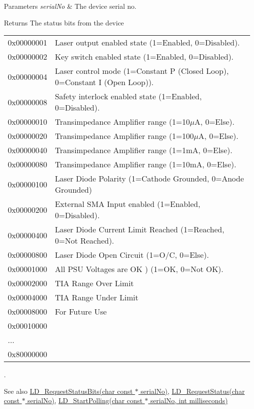 \begin{DoxyParams}{Parameters}
{\em serial\+No} & The device serial no. \\
\hline
\end{DoxyParams}
\begin{DoxyReturn}{Returns}
The status bits from the device \tabulinesep=1mm
\begin{longtabu} spread 0pt [c]{*2{|X[-1]}|}
\hline
0x00000001&Laser output enabled state (1=Enabled, 0=Disabled). \\
0x00000002&Key switch enabled state (1=Enabled, 0=Disabled). \\
0x00000004&Laser control mode (1=Constant P (Closed Loop), 0=Constant I (Open Loop)). \\
0x00000008&Safety interlock enabled state (1=Enabled, 0=Disabled). \\
0x00000010&Transimpedance Amplifier range (1=10{$\mu$}A, 0=Else). \\
0x00000020&Transimpedance Amplifier range (1=100{$\mu$}A, 0=Else). \\
0x00000040&Transimpedance Amplifier range (1=1mA, 0=Else). \\
0x00000080&Transimpedance Amplifier range (1=10mA, 0=Else). \\
0x00000100&Laser Diode Polarity (1=Cathode Grounded, 0=Anode Grounded) \\
0x00000200&External S\+MA Input enabled (1=Enabled, 0=Disabled). \\
0x00000400&Laser Diode Current Limit Reached (1=Reached, 0=Not Reached). \\
0x00000800&Laser Diode Open Circuit (1=O/C, 0=Else). \\
0x00001000&All P\+SU Voltages are OK ) (1=OK, 0=Not OK). \\
0x00002000&T\+IA Range Over Limit \\
0x00004000&T\+IA Range Under Limit \\
0x00008000&For Future Use \\
0x00010000&\\
...&\\
0x80000000&\\
\end{longtabu}
. 
\end{DoxyReturn}
\begin{DoxySeeAlso}{See also}
\hyperlink{group___t_cube_laser_diode_gac5237cf13547f195279bfe5554ba838a}{L\+D\+\_\+\+Request\+Status\+Bits(char const $\ast$ serial\+No)}, \hyperlink{group___t_cube_laser_diode_ga8b31043302c58ec93b4d28ec93e80ab3}{L\+D\+\_\+\+Request\+Status(char const $\ast$ serial\+No)}, \hyperlink{group___t_cube_laser_diode_ga1318b935588e4edff6e754c3f4807231}{L\+D\+\_\+\+Start\+Polling(char const $\ast$ serial\+No, int milliseconds)}


\end{DoxySeeAlso}
